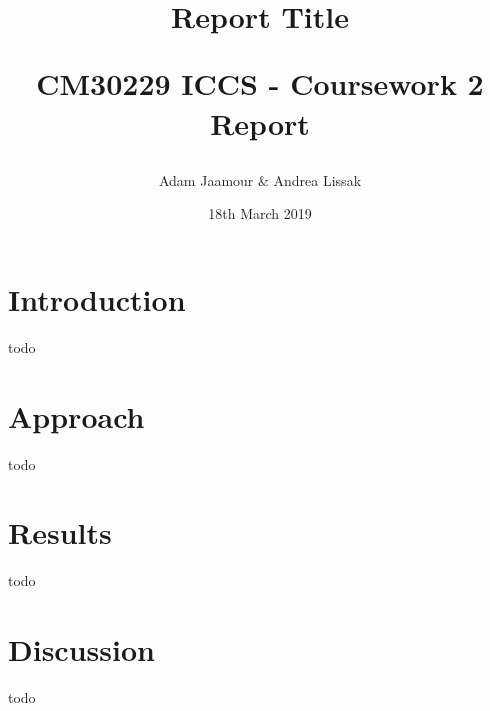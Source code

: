 \documentclass[a4paper,12pt,twocolumn]{article}
\title{
    Report Title\\
    \begin{large}
        CM30229 ICCS - Coursework 2 Report
    \end{large}
}
\author{Adam Jaamour & Andrea Lissak}
\date{18th March 2019}
\begin{document}
\maketitle
\thispagestyle{empty}
\clearpage
\setcounter{page}{1}


\section{Introduction}

todo


\section{Approach}

todo


\section{Results}

todo


\section{Discussion}

todo

\end{document}
